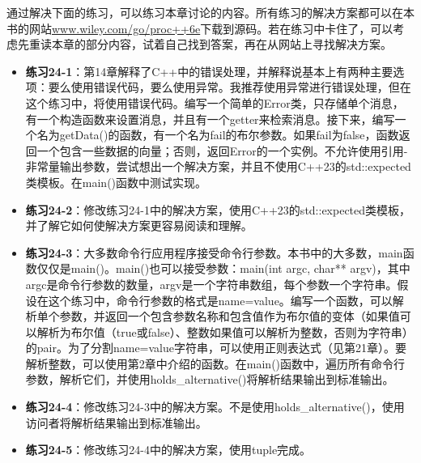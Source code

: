 通过解决下面的练习，可以练习本章讨论的内容。所有练习的解决方案都可以在本书的网站\url{www.wiley.com/go/proc++6e}下载到源码。若在练习中卡住了，可以考虑先重读本章的部分内容，试着自己找到答案，再在从网站上寻找解决方案。

\begin{itemize}
\item
\textbf{练习24-1}：第14章解释了C++中的错误处理，并解释说基本上有两种主要选项：要么使用错误代码，要么使用异常。我推荐使用异常进行错误处理，但在这个练习中，将使用错误代码。编写一个简单的Error类，只存储单个消息，有一个构造函数来设置消息，并且有一个getter来检索消息。接下来，编写一个名为getData()的函数，有一个名为fail的布尔参数。如果fail为false，函数返回一个包含一些数据的向量；否则，返回Error的一个实例。不允许使用引用-非常量输出参数，尝试想出一个解决方案，并且不使用C++23的std::expected类模板。在main()函数中测试实现。

\item
\textbf{练习24-2}：修改练习24-1中的解决方案，使用C++23的std::expected类模板，并了解它如何使解决方案更容易阅读和理解。

\item
\textbf{练习24-3}：大多数命令行应用程序接受命令行参数。本书中的大多数，main函数仅仅是main()。main()也可以接受参数：main(int argc, char** argv)，其中argc是命令行参数的数量，argv是一个字符串数组，每个参数一个字符串。假设在这个练习中，命令行参数的格式是name=value。编写一个函数，可以解析单个参数，并返回一个包含参数名称和包含值作为布尔值的变体（如果值可以解析为布尔值（true或false）、整数如果值可以解析为整数，否则为字符串）的pair。为了分割name=value字符串，可以使用正则表达式（见第21章）。要解析整数，可以使用第2章中介绍的函数。在main()函数中，遍历所有命令行参数，解析它们，并使用holds\_alternative()将解析结果输出到标准输出。

\item
\textbf{练习24-4}：修改练习24-3中的解决方案。不是使用holds\_alternative()，使用访问者将解析结果输出到标准输出。

\item
\textbf{练习24-5}：修改练习24-4中的解决方案，使用tuple完成。
\end{itemize}


